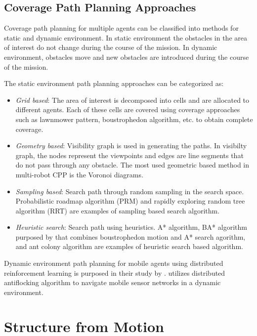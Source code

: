 \subsection{Coverage Path Planning Approaches}

Coverage path planning for multiple agents can be classified into methods for static and dynamic environment. In static environment the obstacles in the area of interest do not change during the course of the mission. In dynamic environment, obstacles move and new obstacles are introduced during the course of the mission.

The static environment path planning approaches can be categorized as:

\begin{itemize}
	\item \textit{Grid based}: The area of interest is decomposed into cells and are allocated to different agents. Each of these cells are covered using coverage approaches such as lawnmower pattern, boustrophedon algorithm, etc. to obtain complete coverage.
	\item \textit{Geometry based}: Visibility graph is used in generating the paths. In visibilty graph, the nodes represent the viewpoints and edges are line segments that do not pass through any obstacle. The most used geometric based method in multi-robot CPP is the Voronoi diagrams.
	\item \textit{Sampling based}: Search path through random sampling in the search space. Probabilistic roadmap algorithm (PRM) and rapidly exploring random tree algorithm (RRT) are examples of sampling based search algorithm. 
	\item \textit{Heuristic search}: Search path using heuristics. A* algorithm, BA* algorithm purposed by  that combines boustrophedon motion and A* search agorithm, and ant colony algorithm are examples of heuristic search based algorithm.
\end{itemize}

Dynamic environment path planning for mobile agents using distributed reinforcement learning is purposed in their study by .  utilizes distributed antiflocking algorithm to navigate mobile sensor networks in a dynamic environment.

\section{Structure from Motion}

